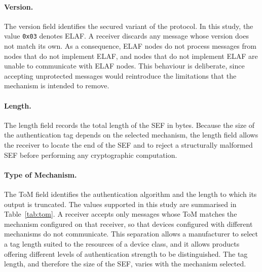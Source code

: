 \paragraph{Version.} The version field identifies the secured variant of the protocol. In this study, the value \texttt{0x03} denotes ELAF. A receiver discards any message whose version does not match its own. As a consequence, ELAF nodes do not process messages from nodes that do not implement ELAF, and nodes that do not implement ELAF are unable to communicate with ELAF nodes. This behaviour is deliberate, since accepting unprotected messages would reintroduce the limitations that the mechanism is intended to remove.

\paragraph{Length.} The length field records the total length of the SEF in bytes. Because the size of the authentication tag depends on the selected mechanism, the length field allows the receiver to locate the end of the SEF and to reject a structurally malformed SEF before performing any cryptographic computation.

\paragraph{Type of Mechanism.} The ToM field identifies the authentication algorithm and the length to which its output is truncated. The values supported in this study are summarised in Table~\ref{tab:tom}. A receiver accepts only messages whose ToM matches the mechanism configured on that receiver, so that devices configured with different mechanisms do not communicate. This separation allows a manufacturer to select a tag length suited to the resources of a device class, and it allows products offering different levels of authentication strength to be distinguished. The tag length, and therefore the size of the SEF, varies with the mechanism selected.

